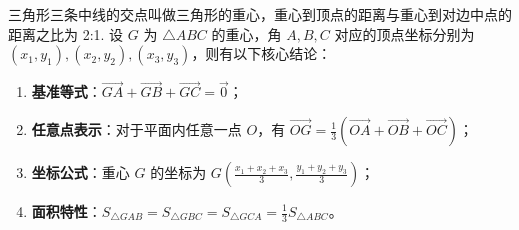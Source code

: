 \begin{statementbox}
三角形三条中线的交点叫做三角形的重心，重心到顶点的距离与重心到对边中点的距离之比为 2:1.
设 $G$ 为 $\triangle ABC$ 的重心，角 $A, B, C$ 对应的顶点坐标分别为 $(x_1, y_1), (x_2, y_2), (x_3, y_3)$，则有以下核心结论：
\begin{enumerate}
    \item \textbf{基准等式}：$\vec{GA} + \vec{GB} + \vec{GC} = \vec{0}$；
    \item \textbf{任意点表示}：对于平面内任意一点 $O$，有 $\vec{OG} = \frac{1}{3}(\vec{OA} + \vec{OB} + \vec{OC})$；
    \item \textbf{坐标公式}：重心 $G$ 的坐标为 $G\left( \frac{x_1+x_2+x_3}{3}, \frac{y_1+y_2+y_3}{3} \right)$；
    \item \textbf{面积特性}：$S_{\triangle GAB} = S_{\triangle GBC} = S_{\triangle GCA} = \frac{1}{3}S_{\triangle ABC}$。
\end{enumerate}
\end{statementbox}